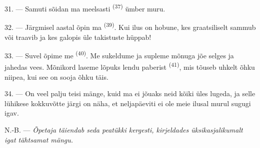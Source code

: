 \VUsaut{4.6mm}
\VUsaut{3.0mm}

31. --- Samuti sõidan ma meelsasti \textsuperscript{(37)} ümber
muru.

32. --- Järgmisel aastal õpin ma \textsuperscript{(39)}. Kui ilus on
hobune, kes graatsiliselt sammub või traavib ja kes galopis üle takistuste hüppab!

33. --- Suvel õpime me \textsuperscript{(40)}. Me sukeldume ja
supleme mõnuga jõe selges ja jahedas vees. Mõnikord laseme lõpuks lendu paberist
\textsuperscript{(41)}, mis tõuseb uhkelt õhku niipea, kui see on
sooja õhku täis.

34. --- On veel palju teisi mänge, kuid ma ei jõuaks neid kõiki üles lugeda, ja selle
lühikese kokkuvõtte järgi on näha, et neljapäeviti ei ole meie ilusal murul sugugi
igav.

N.-B. --- \textit{Õpetaja täiendab seda peatükki kergesti, kirjeldades
üksikasjalikumalt igat tähtsamat mängu.}
\VUsaut{6.0mm}
\VUfilet{22mm}
